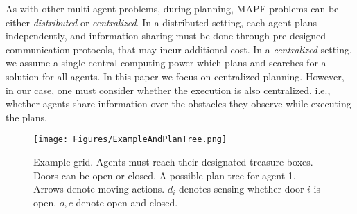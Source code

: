 \documentclass[letterpaper]{article} %
\newcommand{\commentout}[1]{}
\begin{document}
As with other multi-agent problems, during planning, MAPF problems can be either \emph{distributed} or \emph{centralized}. In a distributed setting, each agent plans independently, and information sharing must be done through pre-designed communication protocols, that may incur additional cost. In a \emph{centralized} setting, we assume a single central computing power which plans and searches for a solution for all agents.
In this paper we focus on centralized planning. However, in our case, one must consider whether the execution is also centralized, i.e., whether agents share information over the obstacles they observe while executing the plans.
\begin{figure}[t]
    \centering
      \texttt{[image: Figures/ExampleAndPlanTree.png]}
      \caption{Example grid. Agents must reach their designated treasure boxes. Doors can be open or closed. A possible plan tree for agent 1. Arrows denote moving actions. $d_i$ denotes sensing whether door $i$ is open. $o,c$ denote open and closed.}
    \label{fig:Example}
\end{figure}
\commentout{
\begin{figure}[t]
    \begin{subfigure}[b]{0.5\textwidth}
    \centering
      \texttt{[image: Figures/Example5x5.png]}
      \caption{Example grid. Agents must reach their designated treasure boxes. Doors can be open or closed.}
    \end{subfigure}\quad
    \begin{subfigure}[b]{0.5\textwidth}
      \texttt{[image: Figures/PlanTree.png]}
      \caption{A possible plan tree for agent 1. Arrows denote moving actions. $d_i$ denotes sensing whether door $i$ is open. $o,c$ denote open and closed.}
      \label{fig:PlanTree}
    \end{subfigure}
    \caption{Running example.}
    \label{fig:Example}
\end{figure}
}
\end{document}

